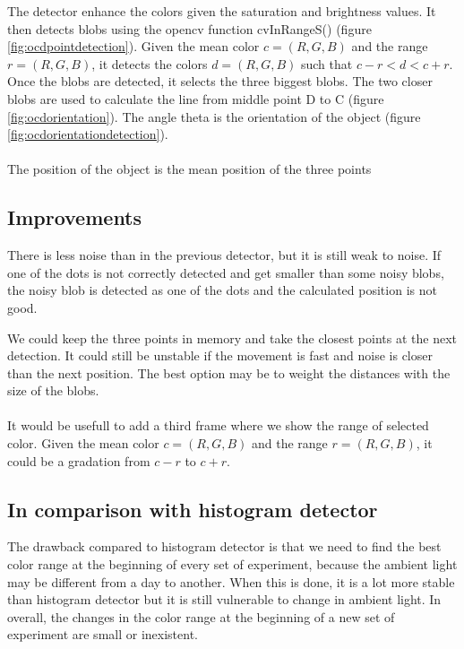 The detector enhance the colors given the saturation and brightness 
values. It then detects blobs using the opencv function cvInRangeS() 
(figure \ref{fig:ocdpointdetection}). Given the mean color $c = (R,G,B)$
and the range $r = (R,G,B)$, it detects the colors $d=(R,G,B)$ such that
$c-r < d < c+r$.
Once the blobs are detected, it selects the three biggest blobs. The 
two closer blobs are used to calculate the line from middle point D to C (figure 
\ref{fig:ocdorientation}). 
The angle theta is the orientation of the object (figure \ref{fig:ocdorientationdetection}).
\\
\\
The position of the object is the mean position of the three points

\subsection{Improvements}
\label{sec:ocd:improvements}

There is less noise than in the previous detector, but it is still 
weak to noise. If one of the dots is not correctly detected and get 
smaller than some noisy blobs, the noisy blob is detected as one of 
the dots and the calculated position is not good.

We could keep the three points in memory and take the closest points 
at the next detection. It could still be unstable if the movement is 
fast and noise is closer than the next position. The best option may 
be to weight the distances with the size of the blobs. 
\\
\\
It would be usefull to add a third frame where we show the range of 
selected color. Given the mean color $c = (R,G,B)$ and the range 
$r = (R,G,B)$, it could be a gradation from $c-r$ to $c+r$. 

\subsection{In comparison with histogram detector}
\label{sec:ocd:comparison}
The drawback compared to histogram detector is that we need to find 
the best color range at the beginning of every set of experiment, 
because the ambient light may be different from a day to another. When 
this is done, it is a lot more stable than histogram detector but it 
is still vulnerable to change in ambient light. In overall, the changes 
in the color range at the beginning of a new set of experiment are 
small or inexistent.

